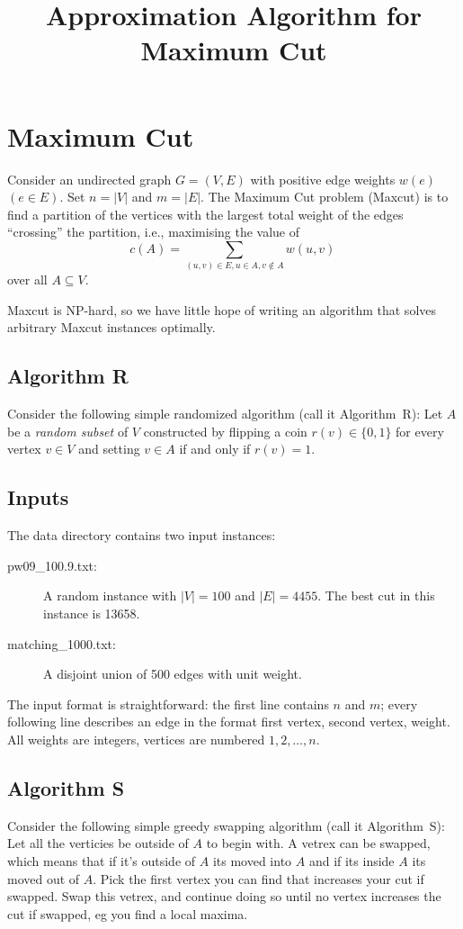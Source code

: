 \documentclass{tufte-handout}
\title{\sf Approximation Algorithm for Maximum Cut}
\date{}
\begin{document}
\maketitle

\section{Maximum Cut}
Consider an undirected graph $G=(V,E)$ with positive edge weights
$w(e)$ $(e\in E)$.
Set $n=|V|$ and $m=|E|$.
The Maximum Cut problem (Maxcut) is to find a partition of the
vertices with the largest total weight of the edges ``crossing'' the
partition, i.e., maximising the value of \[c(A)= \sum_{(u,v)\in E,
  u\in A, v\notin A} w(u,v)\,\] over all $A\subseteq V$.

Maxcut is NP-hard, so we have little hope of writing an algorithm that
solves arbitrary Maxcut instances optimally.

\subsection{ Algorithm R}

Consider the following simple randomized algorithm (call it
Algorithm~R): Let $A$ be a \emph{random subset} of $V$ constructed by
flipping a coin $r(v)\in\{0,1\}$ for every vertex $v\in V$ and setting
$v\in A$ if and only if $r(v)=1$.

\subsection{Inputs}
The  data directory contains two input instances:
\begin{description}
\item[ pw09\_100.9.txt:] A random instance with $|V|=100$ and
  $|E|=4455$. The best cut in this instance is
  13658.
\item[ matching\_1000.txt:] A disjoint union of 500 edges with unit weight.
\end{description}

The input format is straightforward: the first line contains $n$ and
$m$; every following line describes an edge in the format first
vertex, second vertex, weight.
All weights are integers, vertices are numbered $1,2,\ldots, n$.

\subsection{Algorithm S}
Consider the following simple greedy swapping algorithm (call it 
Algorithm~S): Let all the verticies be outside of $A$ to begin with.
A vetrex can be swapped, which means that if it's outside of $A$ its moved into
$A$ and if its inside $A$ its moved out of $A$.
Pick the first vertex you can find that increases your cut if swapped.
Swap this vetrex, and continue doing so until no vertex increases the cut
if swapped, eg you find a local maxima.
\end{document}
